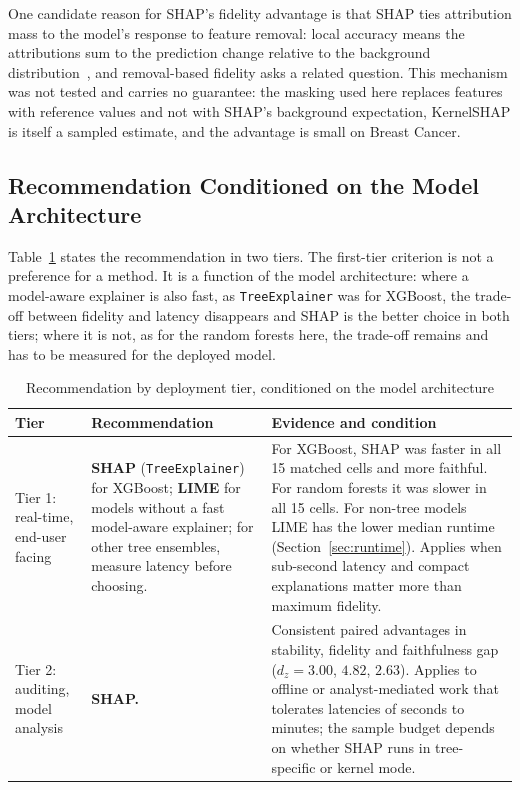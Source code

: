 \documentclass{cleiej}
\begin{document}
One candidate reason for SHAP's fidelity advantage is that SHAP ties
attribution mass to the model's response to feature removal: local accuracy
means the attributions sum to the prediction change relative to the
background distribution~\cite{lundberg2017unified}, and removal-based
fidelity asks a related question. This mechanism was not tested and carries
no guarantee: the masking used here replaces features with reference values
and not with SHAP's background expectation, KernelSHAP is itself a sampled
estimate, and the advantage is small on Breast Cancer.

\subsection{Recommendation Conditioned on the Model Architecture}
\label{sec:recommendations}

Table~\ref{tab:hybrid_deployment} states the recommendation in two tiers.
The first-tier criterion is not a preference for a method. It is a function
of the model architecture: where a model-aware explainer is also fast, as
\texttt{TreeExplainer} was for XGBoost, the trade-off between fidelity and
latency disappears and SHAP is the better choice in both tiers; where it is
not, as for the random forests here, the trade-off remains and has to be
measured for the deployed model.

\begin{table}[htb]
\centering
\caption{Recommendation by deployment tier, conditioned on the model
architecture}
\label{tab:hybrid_deployment}
\begin{tabularx}{\linewidth}{p{2.4cm} >{\raggedright\arraybackslash}p{4.2cm} X}
\toprule
\textbf{Tier} & \textbf{Recommendation} & \textbf{Evidence and condition} \\
\midrule
Tier 1: real-time, end-user facing &
\textbf{SHAP} (\texttt{TreeExplainer}) for XGBoost; \textbf{LIME} for
models without a fast model-aware explainer; for other tree ensembles,
measure latency before choosing. &
For XGBoost, SHAP was faster in all 15 matched cells and more faithful.
For random forests it was slower in all 15 cells. For non-tree models LIME
has the lower median runtime (Section~\ref{sec:runtime}). Applies when
sub-second latency and compact explanations matter more than maximum
fidelity. \\[4pt]
Tier 2: auditing, model analysis &
\textbf{SHAP.} &
Consistent paired advantages in stability, fidelity and faithfulness gap
($d_z = 3.00$, $4.82$, $2.63$). Applies to offline or analyst-mediated work
that tolerates latencies of seconds to minutes; the sample budget depends
on whether SHAP runs in tree-specific or kernel mode. \\
\bottomrule
\end{tabularx}
\end{table}
\end{document}
